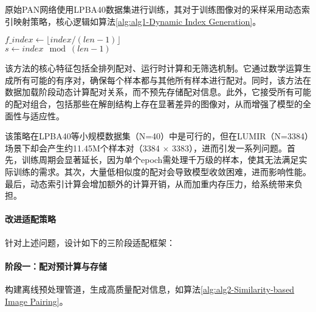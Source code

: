原始PAN网络使用LPBA40数据集进行训练，其对于训练图像对的采样采用动态索引映射策略，核心逻辑如算法\ref{alg:alg1-Dynamic Index Generation}。

\begin{algorithm}

    \label{alg:alg1-Dynamic Index Generation}

    $f\_index \gets \lfloor index / (len-1) \rfloor$ \\
    $s \gets index \mod (len-1)$ \\
\end{algorithm}


该方法的核心特征包括全排列配对、运行时计算和无筛选机制。它通过数学运算生成所有可能的有序对，确保每个样本都与其他所有样本进行配对。同时，该方法在数据加载阶段动态计算配对关系，而不预先存储配对信息。此外，它接受所有可能的配对组合，包括那些在解剖结构上存在显著差异的图像对，从而增强了模型的全面性与适应性。

该策略在LPBA40等小规模数据集（N=40）中是可行的，但在LUMIR（N=3384）场景下却会产生约11.45M个样本对（3384 $\times$ 3383），进而引发一系列问题。首先，训练周期会显著延长，因为单个epoch需处理千万级的样本，使其无法满足实际训练的需求。其次，大量低相似度的配对会导致模型收敛困难，进而影响性能。最后，动态索引计算会增加额外的计算开销，从而加重内存压力，给系统带来负担。

\paragraph{改进适配策略}
针对上述问题，设计如下的三阶段适配框架：

\paragraph{阶段一：配对预计算与存储}


构建离线预处理管道，生成高质量配对信息，如算法\ref{alg:alg2-Similarity-based Image Pairing}。

